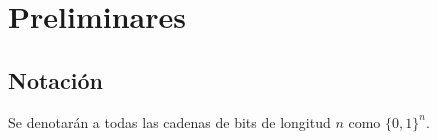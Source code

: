 %
%

\section{Preliminares}


\subsection{Notación}


Se denotarán a todas las cadenas de bits de longitud $ n $ como $ \{ 0, 1 \}^n $.

